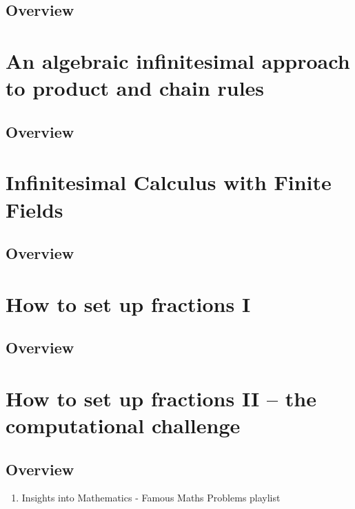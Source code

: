 \documentclass{article}
\begin{document}
\subsection{Overview}%
\label{sub:Overview}
\section{An algebraic infinitesimal approach to product and chain rules}
\subsection{Overview}%
\label{sub:Overview}
\section{Infinitesimal Calculus with Finite Fields}
\subsection{Overview}%
\label{sub:Overview}
\section{How to set up fractions I}
\subsection{Overview}%
\label{sub:Overview}
\section{How to set up fractions II -- the computational challenge}
\subsection{Overview}%
\label{sub:Overview}

\begin{enumerate}
    \item Insights into Mathematics - Famous Maths Problems playlist
\end{enumerate}
\end{document}

